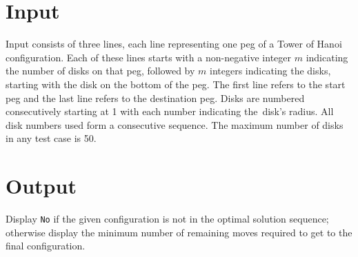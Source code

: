 \section*{Input}
Input consists of three lines, each line representing one peg of a Tower of Hanoi configuration.
Each of these lines starts with a non-negative integer $m$ indicating the number
of disks on that peg, followed by $m$ integers indicating the disks, starting
with the disk on the bottom of the peg.  The first line 
refers to the start peg and the last line refers to the destination peg.
Disks are numbered consecutively starting at 1 with each number indicating the\
disk's radius.  All disk numbers used form a consecutive sequence. The
maximum number of disks in any test case is 50.

\section*{Output}
Display {\tt No} if the given configuration is not in the optimal solution sequence; otherwise display the minimum number of remaining moves required to get to
the final configuration.

\pagebreak



